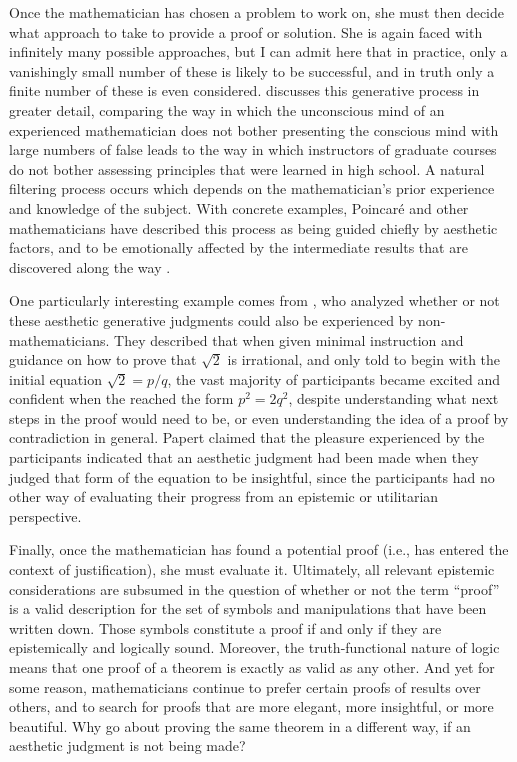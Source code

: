 \documentclass[a4paper,man,natbib]{apa6}
\begin{document}
Once the mathematician has chosen a problem to work on, she must then decide what approach to take to provide
a proof or solution. She is again faced with infinitely many possible approaches, but I can admit
here that in practice, only a vanishingly small number of these is likely to be successful, and in truth
only a finite number of these is even considered. \cite{poincare_mathematical_1910} discusses this generative 
process in greater detail, comparing the way in which the unconscious mind of an experienced mathematician does not
bother presenting the conscious mind with large numbers of false leads to the way in which instructors of graduate
courses do not bother assessing principles that were learned in high school.  A natural filtering process occurs
which depends on the mathematician's prior experience and knowledge of the subject. With concrete examples, 
Poincaré and other mathematicians have described this process as being guided chiefly by aesthetic factors, and to be 
emotionally affected by the intermediate results that are discovered along the way \citep{sinclair_roles_2004}.

One particularly interesting example comes from \citet{papert_mathematical_1978}, who analyzed whether or not
these aesthetic generative judgments could also be experienced by non-mathematicians. They described that when
given minimal instruction and guidance on how to prove that $\sqrt{2}$ is irrational, and only told to begin with
the initial equation $\sqrt{2}=p/q$, the vast majority of participants became excited and confident when the reached 
the form $p^2=2q^2$, despite understanding what next steps in the proof would need to be, or even understanding
the idea of a proof by contradiction in general. Papert claimed that the pleasure experienced by the participants
indicated that an aesthetic judgment had been made when they judged that form of the equation to be insightful, since 
the participants had no other way of evaluating their progress from an epistemic or utilitarian perspective.

Finally, once the mathematician has found a potential proof (i.e., has entered the context of justification), 
she must evaluate it. Ultimately, all relevant epistemic
considerations are subsumed in the question of whether or not the term ``proof'' is a valid description for the set
of symbols and manipulations that have been written down. Those symbols constitute a proof if and only if they
are epistemically and logically sound. Moreover, the truth-functional nature of logic means that one proof
of a theorem is exactly as valid as any other. And yet for some reason, mathematicians continue to prefer certain
proofs of results over others, and to search for proofs that are more elegant, more insightful, or more beautiful.
Why go about proving the same theorem in a different way, if an aesthetic judgment is not being made?
\end{document}
